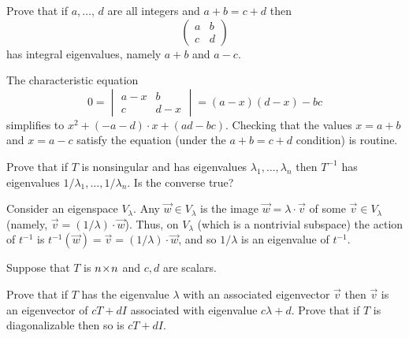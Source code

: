 \begin{exercises}
\begin{answer}
    \end{answer}
  \item 
    Prove that if $a,\ldots,\,d$ are all integers and \( a+b=c+d \) then
    \begin{equation*}
      \begin{pmatrix}
         a  &b  \\
         c  &d
      \end{pmatrix}
    \end{equation*}
    has integral eigenvalues, namely \( a+b \) and \( a-c \).
    \begin{answer}
      The characteristic equation 
      \begin{equation*}
        0=
        \begin{vmatrix}
          a-x  &b  \\
          c    &d-x 
        \end{vmatrix}
        =(a-x)(d-x)-bc
      \end{equation*}
      simplifies to $x^2+(-a-d)\cdot x + (ad-bc)$.
      Checking that the values $x=a+b$ and $x=a-c$ satisfy the equation 
      (under the $a+b=c+d$ condition) is routine. 
    \end{answer}
  \recommended \item
    Prove that if \( T \) is nonsingular and has eigenvalues
    \( \lambda_1,\dots,\lambda_n \) then \( T^{-1} \) has eigenvalues
    \( 1/\lambda_1,\dots,1/\lambda_n \).
    Is the converse true?
    \begin{answer}
      Consider an eigenspace $V_{\lambda}$.
      Any $\vec{w}\in V_{\lambda}$ is the image
      $\vec{w}=\lambda\cdot\vec{v}$ of some $\vec{v}\in V_{\lambda}$ 
      (namely, $\vec{v}=(1/\lambda)\cdot\vec{w}$).
      Thus, on $V_{\lambda}$ (which is a nontrivial subspace) 
      the action of $t^{-1}$ is 
      $t^{-1}(\vec{w})=\vec{v}=(1/\lambda)\cdot\vec{w}$,
      and so $1/\lambda$ is an eigenvalue of $t^{-1}$.
    \end{answer}
  \recommended \item
    Suppose that \( T \) is \( n \! \times \! n \) and \( c,d \) are scalars.
    \begin{exparts}
      \partsitem Prove that if \( T \) has the eigenvalue 
        \( \lambda \) with an associated
        eigenvector \( \vec{v} \) then \( \vec{v} \) is an eigenvector of
        \( cT+dI \) associated with eigenvalue \( c\lambda+d \).
      \partsitem Prove that if \( T \) is diagonalizable then so is
        \( cT+dI \).
    \end{exparts}

\end{exercises}

